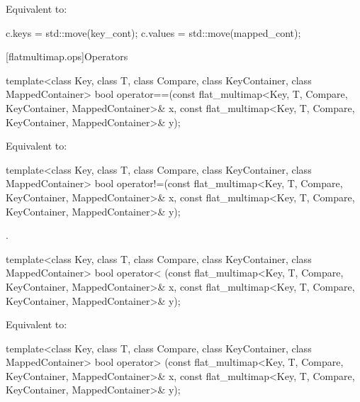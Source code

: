 \begin{codeblock}
\begin{codeblock}
\begin{codeblock}
\begin{addedblock}
\begin{itemdescr}
\pnum
\effects Equivalent to:
\begin{codeblock}
c.keys = std::move(key_cont);
c.values = std::move(mapped_cont);
\end{codeblock}
\end{itemdescr}

[flatmultimap.ops]{Operators}

%
\begin{itemdecl}
template<class Key, class T, class Compare, class KeyContainer, class MappedContainer>
  bool operator==(const flat_multimap<Key, T, Compare, KeyContainer, MappedContainer>& x,
                  const flat_multimap<Key, T, Compare, KeyContainer, MappedContainer>& y);
\end{itemdecl}

\begin{itemdescr}
\pnum
\effects Equivalent to:
\end{itemdescr}

%
\begin{itemdecl}
template<class Key, class T, class Compare, class KeyContainer, class MappedContainer>
  bool operator!=(const flat_multimap<Key, T, Compare, KeyContainer, MappedContainer>& x,
                  const flat_multimap<Key, T, Compare, KeyContainer, MappedContainer>& y);
\end{itemdecl}

\begin{itemdescr}
\pnum \returns {}.
\end{itemdescr}

%
\begin{itemdecl}
template<class Key, class T, class Compare, class KeyContainer, class MappedContainer>
  bool operator< (const flat_multimap<Key, T, Compare, KeyContainer, MappedContainer>& x,
                  const flat_multimap<Key, T, Compare, KeyContainer, MappedContainer>& y);
\end{itemdecl}

\begin{itemdescr}
\pnum
\effects Equivalent to:
\end{itemdescr}

%
\begin{itemdecl}
template<class Key, class T, class Compare, class KeyContainer, class MappedContainer>
  bool operator> (const flat_multimap<Key, T, Compare, KeyContainer, MappedContainer>& x,
                  const flat_multimap<Key, T, Compare, KeyContainer, MappedContainer>& y);
\end{itemdecl}


\end{addedblock}
\end{codeblock}
\end{codeblock}
\end{codeblock}
